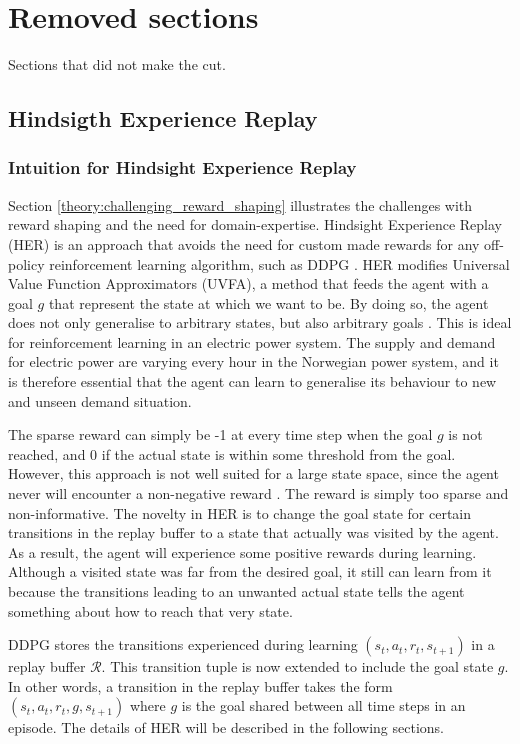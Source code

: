 \documentclass[class=book, crop=false]{standalone}
\begin{document}
\chapter{Removed sections}
Sections that did not make the cut. 


\section{Hindsigth Experience Replay}
\subsection{Intuition for Hindsight Experience Replay}
Section \ref{theory:challenging_reward_shaping}  illustrates the challenges with reward shaping and the need for domain-expertise. Hindsight Experience Replay (HER) is an approach that avoids the need for custom made rewards for any off-policy reinforcement learning algorithm, such as DDPG \cite{DBLP:journals/corr/Andrychowicz_HER}. HER modifies Universal Value Function Approximators (UVFA), a method that feeds the agent with a goal $g$ that represent the state at which we want to be. By doing so, the agent does not only generalise to arbitrary states, but also arbitrary goals \cite{schaul15_goal_states}. This is ideal for reinforcement learning in an electric power system. The
supply and demand for electric power are varying every hour in the Norwegian power system, and it is therefore essential that the agent can learn to generalise its behaviour to new and unseen demand situation. 

The sparse reward can simply be -1 at every time step when the goal $g$ is not reached, and 0 if the actual state is within some threshold from the goal. However, this approach is not well suited for a large state space, since the agent never will encounter a non-negative reward \cite{DBLP:journals/corr/Andrychowicz_HER}. The reward is simply too sparse and non-informative. The novelty in HER is to change the goal state for certain transitions in the replay buffer to a state that actually was visited by the agent. As a result, the agent will experience some positive rewards during learning. Although a visited state was far from the desired goal, it still can learn from it because the transitions leading to an unwanted actual state tells the agent something about how to reach that very state. 

DDPG stores the transitions experienced during learning $(s_{t},a_{t},r_{t},s_{t+1})$ in a replay buffer $\mathcal{R}$. This transition tuple is now extended to include the goal state $g$. In other words, a transition in the replay buffer takes the form $(s_{t},a_{t},r_{t},g,s_{t+1})$ where $g$ is the goal shared between all time steps in an episode. The details of HER will be described in the following sections.
\end{document}
